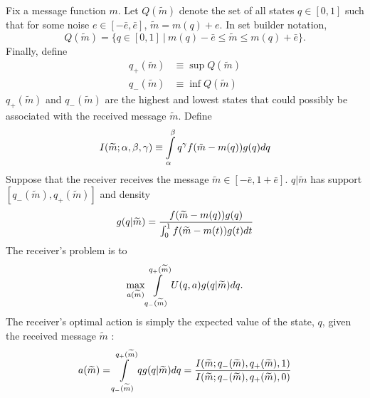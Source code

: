 \documentclass[12pt]{article}
\begin{document}
Fix a message function $m$. Let $Q(\widetilde{m})$ denote the set of all states $q\in [ 0,1]$ such that for some noise $e\in [ -\bar{e},\bar{e}]$, $\widetilde{m}=m(q)+e$. In set builder notation,
\begin{equation}
	Q(\widetilde{m})=\{q\in[0,1]\:|\:m(q)-\bar{e}\leq \widetilde{m}\leq m(q)+\bar{e}\}.
\end{equation}
Finally, define
\begin{align}
	q_{+}(\widetilde{m})&\equiv \sup Q(\widetilde{m})\\
	q_{-}(\widetilde{m})&\equiv \inf Q(\widetilde{m})
\end{align}
$q_{+}(\widetilde{m})$ and $ q_{-}(\widetilde{m})$ are the highest and lowest states that could possibly be associated with the received message $\widetilde{m}$. Define
\begin{equation}
	I(\widetilde{m};\alpha,\beta,\gamma)\equiv\int\displaylimits_{\alpha}^{\beta}{q^{\gamma}f(\tilde{m}-m(q))g(q)dq}
\end{equation}
Suppose that the receiver receives the message $\widetilde{m}\in [ - \bar{e},1+\bar{e}]$. $q|\widetilde{m}$ has support $[q_{-}( \widetilde{m}),q_{+}(\widetilde{m})]$ and density
\begin{equation}\label{eq:posterior} 
	g(q|\widetilde{m})=\frac{f(\widetilde{m}-m(q))g(q)}{\int\displaylimits_{0}^{1}{ f(\widetilde{m}-m(t))g(t)dt}}  
\end{equation} 
The receiver's problem is to 
\begin{equation} 
	\max_{a(\widetilde{m})}\int\displaylimits_{q_{-}(\widetilde{m})}^{q_{+}(\widetilde{m})}{U(q,a)g(q|\widetilde{m})}dq.  
\end{equation} 
The receiver's optimal action is simply the expected value of the state, $q$, given the received message $\widetilde{m}$ : 
\begin{equation}
	a(\widetilde{m})=\int\displaylimits_{q_{-}(\widetilde{m})}^{q_{+}(\widetilde{m})}{qg(q| \widetilde{m})dq}=\frac{I(\widetilde{m};q_{-}(\widetilde{m}),q_{+}(\widetilde{m}),1)}{I(\widetilde{m};q_{-}(\widetilde{m}),q_{+}(\widetilde{m}),0)}\label{eq:optact} 
\end{equation}
\end{document}
